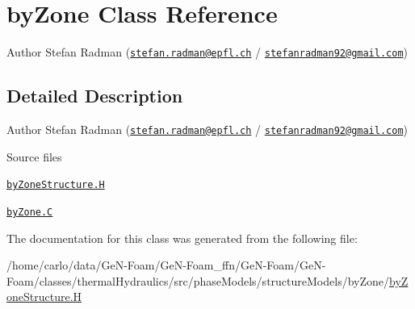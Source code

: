 \hypertarget{classFoam_1_1byZone}{}\section{by\+Zone Class Reference}
\label{classFoam_1_1byZone}


Author Stefan Radman (\href{mailto:stefan.radman@epfl.ch}{\tt stefan.\+radman@epfl.\+ch} / \href{mailto:stefanradman92@gmail.com}{\tt stefanradman92@gmail.\+com})  




\subsection{Detailed Description}
Author Stefan Radman (\href{mailto:stefan.radman@epfl.ch}{\tt stefan.\+radman@epfl.\+ch} / \href{mailto:stefanradman92@gmail.com}{\tt stefanradman92@gmail.\+com}) 

\label{_Description}%
 \begin{DoxyParagraph}{Source files}

\begin{DoxyItemize}
\item \href{../../../home/carlo/data/GeN-Foam/GeN-Foam_ffn/GeN-Foam/GeN-Foam/classes/thermalHydraulics/src/phaseModels/structureModels/byZone/byZoneStructure.H}{\tt by\+Zone\+Structure.\+H} 
\item \href{../../../home/carlo/data/GeN-Foam/GeN-Foam_ffn/GeN-Foam/GeN-Foam/classes/thermalHydraulics/src/phaseModels/structureModels/byZone/byZone.C}{\tt by\+Zone.\+C} 
\end{DoxyItemize}
\end{DoxyParagraph}


The documentation for this class was generated from the following file\+:\begin{DoxyCompactItemize}
\item 
/home/carlo/data/\+Ge\+N-\/\+Foam/\+Ge\+N-\/\+Foam\+\_\+ffn/\+Ge\+N-\/\+Foam/\+Ge\+N-\/\+Foam/classes/thermal\+Hydraulics/src/phase\+Models/structure\+Models/by\+Zone/\hyperlink{byZoneStructure_8H}{by\+Zone\+Structure.\+H}\end{DoxyCompactItemize}
